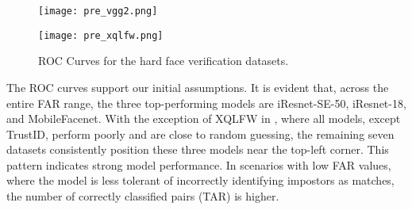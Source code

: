 \documentclass[class=report, crop=false, a4paper, 12pt]{standalone}
\begin{document}
\begin{figure}[H]
  \begin{adjustbox}{center, minipage=1.2\textwidth, margin=0cm -0.1cm 0cm -0.1cm}  %
      \begin{minipage}[c]{0.49\textwidth}
          \centering
          \texttt{[image: pre\_vgg2.png]}
          \label{fig:roc_vgg2_a}
      \end{minipage}
      \hfill
      \begin{minipage}[c]{0.49\textwidth}
          \centering
          \texttt{[image: pre\_xqlfw.png]}
          \label{fig:roc_xqlfw_b}
      \end{minipage}
  \end{adjustbox}
  \vspace{-0.4cm}
  \caption{ROC Curves for the hard face verification datasets.}
  \label{fig:roc_hard}
\end{figure}

\par The ROC curves support our initial assumptions. It is evident that, across the entire FAR range, the three top-performing models are iResnet-SE-50, iResnet-18, and MobileFacenet. With the exception of XQLFW in , where all models, except TrustID, perform poorly and are close to random guessing, the remaining seven datasets consistently position these three models near the top-left corner. This pattern indicates strong model performance. In scenarios with low FAR values, where the model is less tolerant of incorrectly identifying impostors as matches, the number of correctly classified pairs (TAR) is higher.
\end{document}
